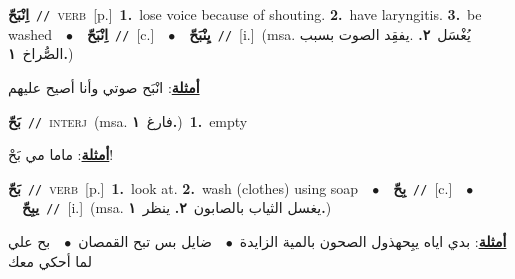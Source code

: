 \documentclass[10pt,a4paper,twoside]{article} %
\begin{document}
\begin{multicols}{2}
{\setlength\topsep{0pt}\textbf{\foreignlanguage{arabic}{اِنْبَحّ}}\ {\color{gray}\texttt{//}\color{black}}\ \textsc{verb}\ [p.]\ \textbf{1.}~lose voice because of shouting.  \textbf{2.}~have laryngitis.  \textbf{3.}~be washed\ \ $\bullet$\ \ \setlength\topsep{0pt}\textbf{\foreignlanguage{arabic}{اِنْبَحّ}}\ {\color{gray}\texttt{//}\color{black}}\ [c.]\ \ $\bullet$\ \ \setlength\topsep{0pt}\textbf{\foreignlanguage{arabic}{يِنْبَحّ}}\ {\color{gray}\texttt{//}\color{black}}\ [i.]\ \color{gray}(msa. \foreignlanguage{arabic}{يُغْسَل}~\foreignlanguage{arabic}{\textbf{٢.}}  .\foreignlanguage{arabic}{يفقِد الصوت بسبب الصُّراخ}~\foreignlanguage{arabic}{\textbf{١.}})\color{black}\  \begin{flushright}\color{gray}\foreignlanguage{arabic}{\textbf{\underline{\foreignlanguage{arabic}{أمثلة}}}: انْبَح صوتي وأنا أصيح عليهم}\end{flushright}\color{black}} \vspace{2mm}

{\setlength\topsep{0pt}\textbf{\foreignlanguage{arabic}{بَحّ}}\ {\color{gray}\texttt{//}\color{black}}\ \textsc{interj}\ \color{gray}(msa. \foreignlanguage{arabic}{فارغ}~\foreignlanguage{arabic}{\textbf{١.}})\color{black}\ \textbf{1.}~empty\  \begin{flushright}\color{gray}\foreignlanguage{arabic}{\textbf{\underline{\foreignlanguage{arabic}{أمثلة}}}: ماما مي بَحْ!}\end{flushright}\color{black}} \vspace{2mm}

{\setlength\topsep{0pt}\textbf{\foreignlanguage{arabic}{بَحّ}}\ {\color{gray}\texttt{//}\color{black}}\ \textsc{verb}\ [p.]\ \textbf{1.}~look at.  \textbf{2.}~wash (clothes) using soap\ \ $\bullet$\ \ \setlength\topsep{0pt}\textbf{\foreignlanguage{arabic}{بِحّ}}\ {\color{gray}\texttt{//}\color{black}}\ [c.]\ \ $\bullet$\ \ \setlength\topsep{0pt}\textbf{\foreignlanguage{arabic}{يبِحّ}}\ {\color{gray}\texttt{//}\color{black}}\ [i.]\ \color{gray}(msa. \foreignlanguage{arabic}{يغسل الثياب بالصابون}~\foreignlanguage{arabic}{\textbf{٢.}}  \foreignlanguage{arabic}{ينظر}~\foreignlanguage{arabic}{\textbf{١.}})\color{black}\  \begin{flushright}\color{gray}\foreignlanguage{arabic}{\textbf{\underline{\foreignlanguage{arabic}{أمثلة}}}: بدي اياه يبِحهذول الصحون بالمية الزايدة\ $\bullet$\ \  ضايل بس تبح القمصان\ $\bullet$\ \  بح علي لما أحكي معك}\end{flushright}\color{black}} \vspace{2mm}


\end{multicols}
\end{document}
